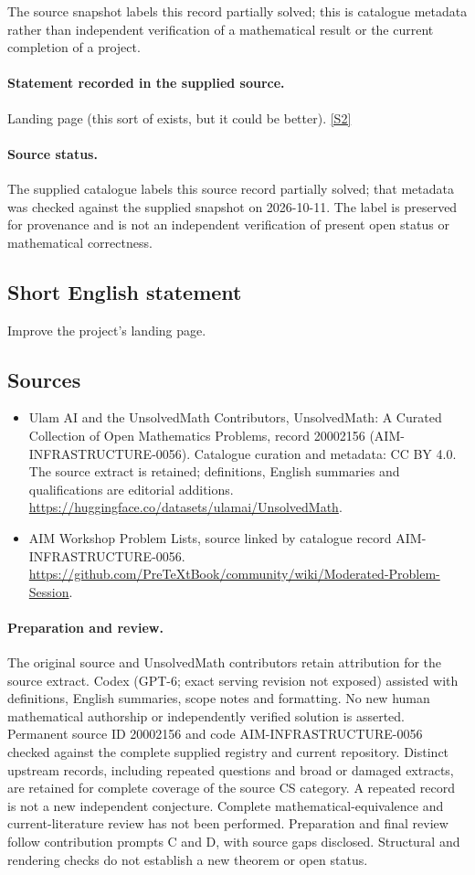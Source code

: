 \documentclass[11pt]{article}
\begin{document}
The source snapshot labels this record partially solved; this is catalogue metadata rather than independent verification of a mathematical result or the current completion of a project.
\paragraph{Statement recorded in the supplied source.}
Landing page (this sort of exists, but it could be better). \href{https://github.com/PreTeXtBook/community/wiki/Moderated-Problem-Session}{[S2]}
\paragraph{Source status.}
The supplied catalogue labels this source record partially solved; that metadata was checked against the supplied snapshot on 2026-10-11. The label is preserved for provenance and is not an independent verification of present open status or mathematical correctness.
\subsection{Short English statement}
Improve the project's landing page.
\subsection{Sources}
\begin{itemize}
\item[S1] Ulam AI and the UnsolvedMath Contributors, UnsolvedMath: A Curated Collection of Open Mathematics Problems, record 20002156 (AIM-INFRASTRUCTURE-0056). Catalogue curation and metadata: CC BY 4.0. The source extract is retained; definitions, English summaries and qualifications are editorial additions.
\url{https://huggingface.co/datasets/ulamai/UnsolvedMath}.
\item[S2] AIM Workshop Problem Lists, source linked by catalogue record AIM-INFRASTRUCTURE-0056.
\url{https://github.com/PreTeXtBook/community/wiki/Moderated-Problem-Session}.
\end{itemize}
\paragraph{Preparation and review.}
The original source and UnsolvedMath contributors retain attribution for the source extract. Codex (GPT-6; exact serving revision not exposed) assisted with definitions, English summaries, scope notes and formatting. No new human mathematical authorship or independently verified solution is asserted. Permanent source ID 20002156 and code AIM-INFRASTRUCTURE-0056 checked against the complete supplied registry and current repository. Distinct upstream records, including repeated questions and broad or damaged extracts, are retained for complete coverage of the source CS category. A repeated record is not a new independent conjecture. Complete mathematical-equivalence and current-literature review has not been performed. Preparation and final review follow contribution prompts C and D, with source gaps disclosed. Structural and rendering checks do not establish a new theorem or open status.
\label{end:20002156}
\end{document}

